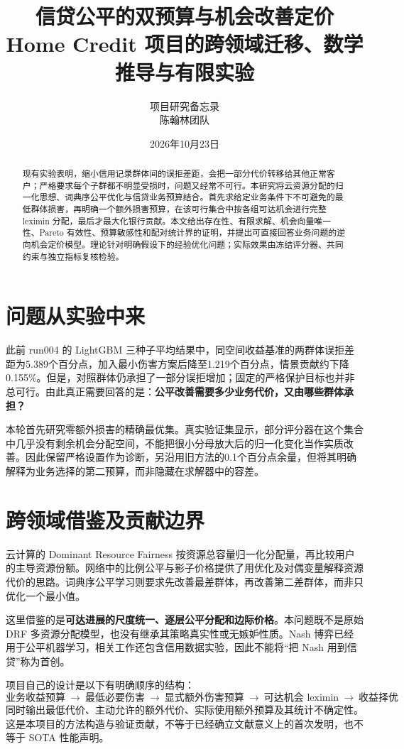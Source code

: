 \documentclass[UTF8,11pt,fontset=fandol]{ctexart}
\title{信贷公平的双预算与机会改善定价\\\large Home Credit 项目的跨领域迁移、数学推导与有限实验}
\author{项目研究备忘录\\陈翰林团队}
\date{2026年10月23日}
\begin{document}
\maketitle
\begin{abstract}
现有实验表明，缩小信用记录群体间的误拒差距，会把一部分代价转移给其他正常客户；严格要求每个子群都不明显受损时，问题又经常不可行。本研究将云资源分配的归一化思想、词典序公平优化与信贷业务预算结合。首先求给定业务条件下不可避免的最低群体损害，再明确一个额外损害预算，在该可行集合中按各组可达机会进行完整 leximin 分配，最后才最大化银行贡献。本文给出存在性、有限求解、机会向量唯一性、Pareto 有效性、预算敏感性和配对统计界的证明，并提出可直接回答业务问题的逆向机会定价模型。理论针对明确假设下的经验优化问题；实际效果由冻结评分器、共同约束与独立指标复核检验。
\end{abstract}

\section{问题从实验中来}
此前 run004 的 LightGBM 三种子平均结果中，同空间收益基准的两群体误拒差距为5.389个百分点，加入最小伤害方案后降至1.219个百分点，情景贡献约下降0.155\%。但是，对照群体仍承担了一部分误拒增加；固定的严格保护目标也并非总可行。由此真正需要回答的是：\textbf{公平改善需要多少业务代价，又由哪些群体承担？}

本轮首先研究零额外损害的精确最优集。真实验证集显示，部分评分器在这个集合中几乎没有剩余机会分配空间，不能把很小分母放大后的归一化变化当作实质改善。因此保留严格设置作为诊断，另沿用旧方法的0.1个百分点余量，但将其明确解释为业务选择的第二预算，而非隐藏在求解器中的容差。

\section{跨领域借鉴及贡献边界}
云计算的 Dominant Resource Fairness 按资源总容量归一化分配量，再比较用户的主导资源份额\cite{drf}。网络中的比例公平与影子价格提供了用优化及对偶变量解释资源代价的思路\cite{kelly}。词典序公平学习则要求先改善最差群体，再改善第二差群体，而非只优化一个最小值\cite{lexfair}。

这里借鉴的是\textbf{可达进展的尺度统一、逐层公平分配和边际价格}。本问题既不是原始 DRF 多资源分配模型，也没有继承其策略真实性或无嫉妒性质。Nash 博弈已经用于公平机器学习，相关工作还包含信用数据实验\cite{nash}，因此不能将“把 Nash 用到信贷”称为首创。

项目自己的设计是以下有明确顺序的结构：
\[
\boxed{\text{业务收益预算}\ \to\ \text{最低必要伤害}\ \to\
\text{显式额外伤害预算}\ \to\ \text{可达机会 leximin}\ \to\ \text{收益择优}}
\]
同时输出最低代价、主动允许的额外代价、实际使用额外预算及其统计不确定性。这是本项目的方法构造与验证贡献，不等于已经确立文献意义上的首次发明，也不等于 SOTA 性能声明。
\end{document}
